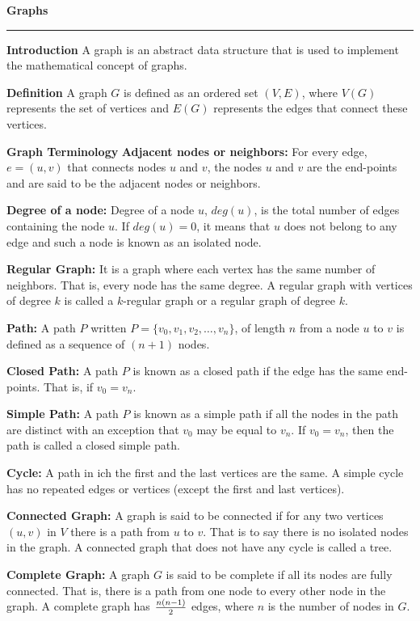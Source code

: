 {\bf Graphs}
\vskip 1mm
\hrule

\vskip 3mm
{\bf Introduction}
\vskip 1mm
A graph is an abstract data structure that is used to implement the mathematical concept of graphs.

\vskip 3mm
{\bf Definition}
\vskip 1mm
A graph $G$ is defined as an ordered set $(V,E)$, where $V(G)$ represents the set of vertices and $E(G)$ represents the edges that connect these vertices.

\filbreak
\vskip 1cm
{\bf Graph Terminology}
\vskip 1mm
{\bf Adjacent nodes or neighbors:} For every edge, $e=(u,v)$ that connects nodes $u$ and $v$, the nodes $u$ and $v$ are the end-points and are said to be the adjacent nodes or neighbors.

\vskip 3mm
{\bf Degree of a node:} Degree of a node $u$, $deg(u)$, is the total number of edges containing the node $u$. If $deg(u)=0$, it means that $u$ does not belong to any edge and such a node is known as an isolated node.

\vskip 3mm
{\bf Regular Graph:} It is a graph where each vertex has the same number of neighbors. That is, every node has the same degree. A regular graph with vertices of degree $k$ is called a $k$-regular graph or a regular graph of degree $k$.

\vskip 3mm
{\bf Path:} A path $P$ written $P=\{v_0,v_1,v_2,\ldots,v_n\}$, of length $n$ from a node $u$ to $v$ is defined as a sequence of $(n+1)$ nodes.

\vskip 3mm
{\bf Closed Path:} A path $P$ is known as a closed path if the edge has the same end-points. That is, if $v_0=v_n$.

\vskip 3mm
{\bf Simple Path:} A path $P$ is known as a simple path if all the nodes in the path are distinct with an exception that $v_0$ may be equal to $v_n$. If $v_0=v_n$, then the path is called a closed simple path.

\vskip 3mm
{\bf Cycle:} A path in ich the first and the last vertices are the same. A simple cycle has no repeated edges or vertices (except the first and last vertices).

\vskip 3mm
{\bf Connected Graph:} A graph is said to be connected if for any two vertices $(u,v)$ in $V$ there is a path from $u$ to $v$. That is to say there is no isolated nodes in the graph. A connected graph that does not have any cycle is called a tree.

\vskip 3mm
{\bf Complete Graph:} A graph $G$ is said to be complete if all its nodes are fully connected. That is, there is a path from one node to every other node in the graph. A complete graph has ${n(n-1)\over 2}$ edges, where $n$ is the number of nodes in $G$.

